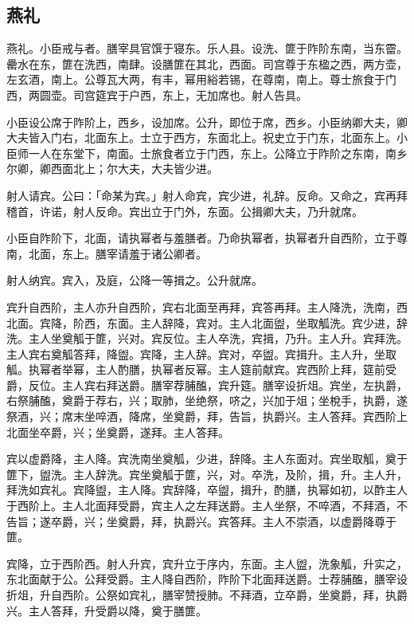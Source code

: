 \documentclass[]{article}
\begin{document}
\hypertarget{header-n32}{%
\subsection{燕礼}\label{header-n32}}

燕礼。小臣戒与者。膳宰具官馔于寝东。乐人县。设洗、篚于阼阶东南，当东霤。罍水在东，篚在洗西，南肆。设膳篚在其北，西面。司宫尊于东楹之西，两方壶，左玄酒，南上。公尊瓦大两，有丰，幂用綌若锡，在尊南，南上。尊士旅食于门西，两圆壶。司宫筵宾于户西，东上，无加席也。射人告具。

小臣设公席于阼阶上，西乡，设加席。公升，即位于席，西乡。小臣纳卿大夫，卿大夫皆入门右，北面东上。士立于西方，东面北上。祝史立于门东，北面东上。小臣师一人在东堂下，南面。士旅食者立于门西，东上。公降立于阼阶之东南，南乡尔卿，卿西面北上；尔大夫，大夫皆少进。

射人请宾。公曰：「命某为宾。」射人命宾，宾少进，礼辞。反命。又命之，宾再拜稽首，许诺，射人反命。宾出立于门外，东面。公揖卿大夫，乃升就席。

小臣自阼阶下，北面，请执幂者与羞膳者。乃命执幂者，执幂者升自西阶，立于尊南，北面，东上。膳宰请羞于诸公卿者。

射人纳宾。宾入，及庭，公降一等揖之。公升就席。

宾升自西阶，主人亦升自西阶，宾右北面至再拜，宾答再拜。主人降洗，洗南，西北面。宾降，阶西，东面。主人辞降，宾对。主人北面盥，坐取觚洗。宾少进，辞洗。主人坐奠觚于篚，兴对。宾反位。主人卒洗，宾揖，乃升。主人升。宾拜洗。主人宾右奠觚答拜，降盥。宾降，主人辞。宾对，卒盥。宾揖升。主人升，坐取觚。执幂者举幂，主人酌膳，执幂者反幂。主人筵前献宾。宾西阶上拜，筵前受爵，反位。主人宾右拜送爵。膳宰荐脯醢，宾升筵。膳宰设折俎。宾坐，左执爵，右祭脯醢，奠爵于荐右，兴；取肺，坐绝祭，哜之，兴加于俎；坐梲手，执爵，遂祭酒，兴；席末坐啐酒，降席，坐奠爵，拜，告旨，执爵兴。主人答拜。宾西阶上北面坐卒爵，兴；坐奠爵，遂拜。主人答拜。

宾以虚爵降，主人降。宾洗南坐奠觚，少进，辞降。主人东面对。宾坐取觚，奠于篚下，盥洗。主人辞洗。宾坐奠觚于篚，兴，对。卒洗，及阶，揖，升。主人升，拜洗如宾礼。宾降盥，主人降。宾辞降，卒盥，揖升，酌膳，执幂如初，以酢主人于西阶上。主人北面拜受爵，宾主人之左拜送爵。主人坐祭，不啐酒，不拜酒，不告旨；遂卒爵，兴；坐奠爵，拜，执爵兴。宾答拜。主人不崇酒，以虚爵降尊于篚。

宾降，立于西阶西。射人升宾，宾升立于序内，东面。主人盥，洗象觚，升实之，东北面献于公。公拜受爵。主人降自西阶，阼阶下北面拜送爵。士荐脯醢，膳宰设折俎，升自西阶。公祭如宾礼，膳宰赞授肺。不拜酒，立卒爵，坐奠爵，拜，执爵兴。主人答拜，升受爵以降，奠于膳篚。
\end{document}
